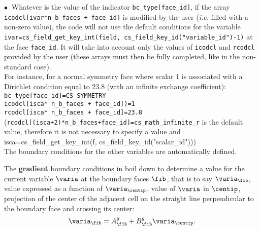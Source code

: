 
$\bullet\ $ Whatever is the value of the indicator \texttt{bc\_type[face\_id]}, if
the array \texttt{icodcl[ivar*n\_b\_faces + face\_id]} is modified by the user ({\em i.e.} filled
with a non-zero value), the code will not use the default
conditions for the variable \texttt{ivar=cs\_field\_get\_key\_int(field, cs\_field\_key\_id("variable\_id")-1)} at the face \texttt{face\_id}. It will
take into account only the values of \texttt{icodcl} and \texttt{rcodcl} provided by the
user (these arrays must then be fully completed, like in the non-standard case). \\
For instance, for a normal symmetry face where scalar 1 is associated with a
Dirichlet condition equal to 23.8 (with an infinite exchange
coefficient):\\
\hspace*{2cm}\texttt{bc\_type[face\_id]=CS\_SYMMETRY}\\
\hspace*{2cm}\texttt{icodcl[isca* n\_b\_faces + face\_id])=1}\\
\hspace*{2cm}\texttt{rcodcl[isca* n\_b\_faces + face\_id]=23.8}\\
(\texttt{rcodcl[(isca+2)*n\_b\_faces+face\_id]=cs\_math\_infinite\_r} is the default value, therefore it is
not necessary to specify a value and isca=cs\_field\_get\_key\_int(f, cs\_field\_key\_id("scalar\_id")))\\
The boundary conditions for the other variables are automatically
defined.

\noindent


The \textbf{gradient} boundary conditions in \CS boil down to determine a
value for the current variable $\varia$ at the boundary faces $\fib$, that is to
say $\varia_\fib$, value expressed as a function of $\varia_{\centip}$, value
of $\varia$ in $\centip$, projection of the center of the adjacent cell on the
straight line perpendicular to the boundary face and crossing its center:
\begin{equation}
\varia_\fib=A_{\fib}^g +B_{\fib}^g \varia_{\centip}.
\end{equation}

